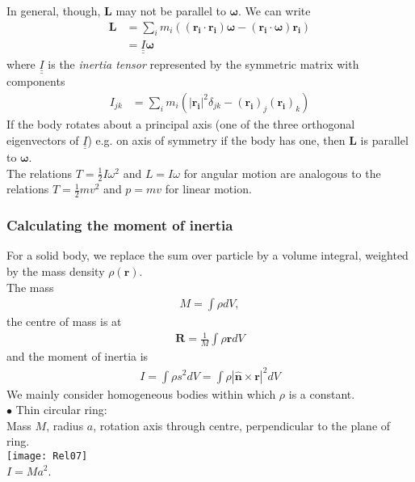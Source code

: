 \documentclass[a4paper]{article}
\begin{document}
In general, though, $\mathbf{L}$ may not be parallel to $\mathbf{\omega}$. We can write
\begin{equation*}
\begin{aligned}
\mathbf{L}&=\sum_i m_i \left(\left(\mathbf{r_i}\cdot\mathbf{r_i}\right)\mathbf{\omega}-\left(\mathbf{r_i}\cdot\mathbf{\omega}\right)\mathbf{r_i}\right)\\
&=\underline{\underline{I}}\mathbf{\omega}
\end{aligned}
\end{equation*}
where $\underline{\underline{I}}$ is the \emph{inertia tensor} represented by the symmetric matrix with components
\begin{equation*}
\begin{aligned}
I_{jk}&= \sum_i m_i\left(|\mathbf{r_i}|^2\delta_{jk}-\left(\mathbf{r_i}\right)_j\left(\mathbf{r_i}\right)_k\right)
\end{aligned}
\end{equation*}
If the body rotates about a principal axis (one of the three orthogonal eigenvectors of $\underline{\underline{I}}$) e.g. on axis of symmetry if the body has one, then $\mathbf{L}$ is parallel to $\mathbf{\omega}$.\\
The relations $T=\frac{1}{2}I\omega^2$ and $L=I\omega$ for angular motion are analogous to the relations $T=\frac{1}{2}mv^2$ and $p=mv$ for linear motion.

\subsubsection{Calculating the moment of inertia}
For a solid body, we replace the sum over particle by a volume integral, weighted by the mass density $\rho\left(\mathbf{r}\right)$.\\
The mass
\begin{equation*}
\begin{aligned}
M=\int \rho dV,
\end{aligned}
\end{equation*}
the centre of mass is at
\begin{equation*}
\begin{aligned}
\mathbf{R}=\frac{1}{M}\int \rho\mathbf{r}dV
\end{aligned}
\end{equation*}
and the moment of inertia is
\begin{equation*}
\begin{aligned}
I=\int \rho s^2 dV=\int \rho |\hat{\mathbf{n}}\times\mathbf{r}|^2 dV
\end{aligned}
\end{equation*}
We mainly consider homogeneous bodies within which $\rho$ is a constant.\\
$\bullet$ Thin circular ring:\\
Mass $M$, radius $a$, rotation axis through centre, perpendicular to the plane of ring.\\
\texttt{[image: Rel07]}\\
$I=Ma^2$.\\
\end{document}
